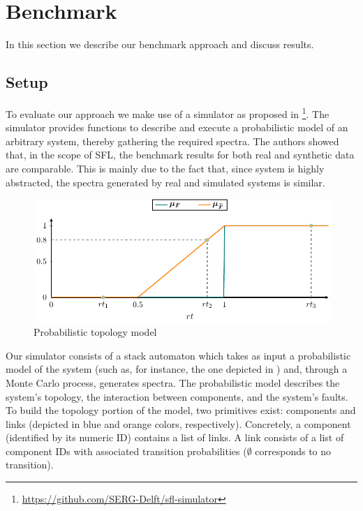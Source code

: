 \section{Benchmark}
\label{sec:fuzzinel:benchmark}
In this section we describe our benchmark approach and discuss
results.
%


\subsection{Setup}
To evaluate our approach we make use of a simulator as proposed in
\citep{Chen13}\footnote{\url{https://github.com/SERG-Delft/sfl-simulator}}.
%
The simulator provides functions to describe and execute a
probabilistic model of an arbitrary system, thereby gathering the
required spectra.
%
The authors showed that, in the scope of \ac{SFL}, the benchmark
results for both real and synthetic data are comparable.
%
This is mainly due to the fact that, since system is highly
abstracted, the spectra generated by real and simulated systems is
similar.
%


\begin{figure}[!ht]
  \includegraphics[page=9]{figures/fuzzinel/figures/main.pdf}
  \caption{Probabilistic topology model\label{fig:fuzzinel:probabilistic-model}}
\end{figure}


Our simulator consists of a stack automaton which takes as input a
probabilistic model of the system (such as, for instance, the one
depicted in ) and, through a
Monte Carlo process, generates spectra.
%
The probabilistic model describes the system's topology, the
interaction between components, and the system's faults.
%
To build the topology portion of the model, two primitives exist:
components and links (depicted in blue and orange colors, respectively).
%
Concretely, a component (identified by its numeric ID) contains a list
of links.
%
A link consists of a list of component IDs with associated transition
probabilities ($\emptyset$ corresponds to no transition).

